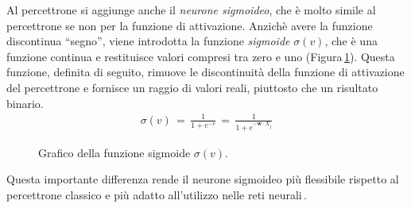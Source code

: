 Al percettrone si aggiunge anche il \textsl{neurone sigmoideo}, che è molto simile al percettrone se non per la funzione di attivazione. Anzichè avere la funzione discontinua ``segno'', viene introdotta la funzione \textsl{sigmoide} $\sigma(v)$, che è una funzione continua e restituisce valori compresi tra zero e uno (Figura\,\ref{fig:sigmoid-function}). Questa funzione, definita di seguito, rimuove le discontinuità della funzione di attivazione del percettrone e fornisce un raggio di valori reali, piuttosto che un risultato binario.
% 
\begin{gather*}
    \sigma(v) \, = \, \frac{1}{1 + e^{-v}} \, = \, \frac{1}{1 + e^{-\mathbf{w} \cdot X_j}}
\end{gather*}
% 
\begin{figure}[!t]
    \centering
    
    \caption[Grafico della funzione sigmoide $\sigma(v)$.]{Grafico della funzione sigmoide $\sigma(v)$.}\label{fig:sigmoid-function}
\end{figure}
% 
Questa importante differenza rende il neurone sigmoideo più flessibile rispetto al percettrone classico e più adatto all'utilizzo nelle reti neurali\,\cite{nielsen2015neural}.

